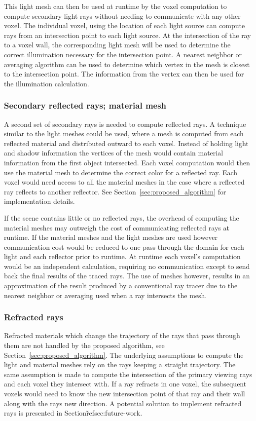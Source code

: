 This light mesh can then be used at runtime by the voxel computation to compute 
secondary light rays without needing to communicate with any other voxel.  The 
individual voxel, using the location of each light source can compute rays from 
an intersection point to each light source.  At the intersection of the ray to a
voxel wall, the corresponding light mesh will be used to determine the correct
illumination necessary for the intersection point.  A nearest neighbor or 
averaging algorithm can be used to determine which vertex in the mesh is closest
to the intersection point.  The information from the vertex can then be used for
the illumination calculation.

\subsubsection{Secondary reflected rays; material mesh}
A second set of secondary rays is needed to compute reflected rays.  A technique 
similar to the light meshes could be used, where a mesh is computed from each 
reflected material and distributed outward to each voxel.  Instead of holding 
light and shadow information the vertices of the mesh would contain material
information from the first object intersected.  Each voxel computation would 
then use the material mesh to determine the correct color for a reflected ray.
Each voxel would need access to all the material meshes in the case where a 
reflected ray reflects to another reflector.  See
Section~\ref{sec:proposed_algorithm} for implementation details.

If the scene contains little or no reflected rays, the overhead of computing the
material meshes may outweigh the cost of communicating reflected rays at 
runtime.  If the material meshes and the light meshes are used however 
communication cost would be reduced to one pass through the domain for each 
light and each reflector prior to runtime.  At runtime each voxel's computation
would be an independent calculation, requiring no communication except to send
back the final results of the traced rays.  The use of meshes however, results 
in an approximation of the result produced by a conventional ray tracer due to 
the nearest neighbor or averaging used when a ray intersects the mesh.

\subsubsection{Refracted rays}
Refracted materials which change the trajectory of the rays that pass through 
them are not handled by the proposed algorithm, see 
Section~\ref{sec:proposed_algorithm}.  The underlying assumptions to compute the
light and material meshes rely on the rays keeping a straight trajectory.  The
same assumption is made to compute the intersection of the primary viewing rays
and each voxel they intersect with.  If a ray refracts in one voxel, the 
subsequent voxels would need to know the new intersection point of that ray and 
their wall along with the rays new direction.  A potential solution to implement
refracted rays is presented in Section\~ref{sec:future-work}.

